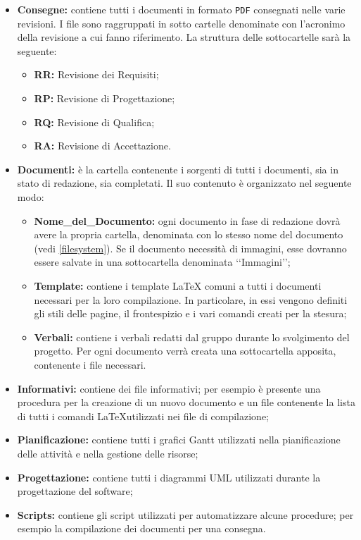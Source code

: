 \begin{itemize}
\item\textbf{Consegne:} contiene tutti i documenti in formato \verb!PDF!\glossario{} consegnati nelle varie revisioni. I file sono raggruppati in sotto cartelle denominate con l'acronimo della revisione a cui fanno riferimento. La struttura delle sottocartelle sarà la seguente:
\begin{itemize}
\item\textbf{RR:} Revisione dei Requisiti;
\item\textbf{RP:} Revisione di Progettazione;
\item\textbf{RQ:} Revisione di Qualifica;
\item\textbf{RA:} Revisione di Accettazione.
\end{itemize}

\item\textbf{Documenti:} è la cartella contenente i sorgenti di tutti i documenti, sia in stato di redazione, sia completati. Il suo contenuto è organizzato nel seguente modo:
\begin{itemize}
\item\textbf{Nome\_del\_Documento:} ogni documento in fase di redazione dovrà avere la propria cartella, denominata con lo stesso nome del documento (vedi \ref{filesystem}). Se il documento necessità di immagini, esse dovranno essere salvate in una sottocartella denominata \lq\lq{}Immagini\rq\rq{};
\item \textbf{Template:} contiene i template \LaTeX{} comuni a tutti i documenti necessari per la loro compilazione. In particolare, in essi vengono definiti gli stili delle pagine, il frontespizio e i vari comandi creati per la stesura;
\item \textbf{Verbali:} contiene i verbali redatti dal gruppo durante lo svolgimento del progetto. Per ogni documento verrà creata una sottocartella apposita, contenente i file necessari.
\end{itemize}

\item\textbf{Informativi:} contiene dei file informativi; per esempio è presente una procedura per la creazione di un nuovo documento e un file contenente la lista di tutti i comandi \LaTeX utilizzati nei file di compilazione;

\item\textbf{Pianificazione:} contiene tutti i grafici Gantt\g{} utilizzati nella pianificazione delle attività e nella gestione delle risorse;

\item\textbf{Progettazione:} contiene tutti i diagrammi UML\g{} utilizzati durante la progettazione del software;
\item\textbf{Scripts:} contiene gli script utilizzati per automatizzare alcune procedure; per esempio la compilazione dei documenti per una consegna.
\end{itemize}

